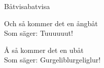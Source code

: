 \begin{song}{Båtvisa}{batvisa}
\begin{vers}
Och så kommer det en ångbåt\\
Som säger: Tuuuuuut!\\
\end{vers}
\begin{vers}
Å så kommer det en ubåt\\
Som säger: Gurgeliblurgeliglur!\\
\end{vers}
\end{song}
